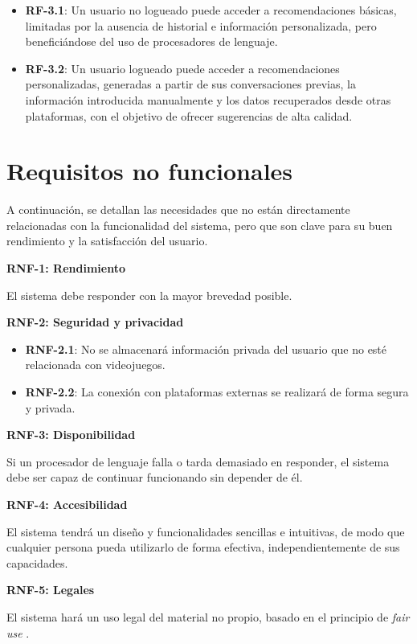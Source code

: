 \begin{itemize}
    \item \textbf{RF-3.1}: Un usuario no logueado puede acceder a recomendaciones básicas, limitadas por la ausencia de historial e información personalizada, pero beneficiándose del uso de procesadores de lenguaje.
    \item \textbf{RF-3.2}: Un usuario logueado puede acceder a recomendaciones personalizadas, generadas a partir de sus conversaciones previas, la información introducida manualmente y los datos recuperados desde otras plataformas, con el objetivo de ofrecer sugerencias de alta calidad.
\end{itemize}

\newpage
\section{Requisitos no funcionales}

A continuación, se detallan las necesidades que no están directamente relacionadas con la funcionalidad del sistema, pero que son clave para su buen rendimiento y la satisfacción del usuario.

\textbf{RNF-1: Rendimiento}

El sistema debe responder con la mayor brevedad posible.

\textbf{RNF-2: Seguridad y privacidad}

\begin{itemize}
    \item \textbf{RNF-2.1}: No se almacenará información privada del usuario que no esté relacionada con videojuegos.
    \item \textbf{RNF-2.2}: La conexión con plataformas externas se realizará de forma segura y privada.
\end{itemize}

\textbf{RNF-3: Disponibilidad}

Si un procesador de lenguaje falla o tarda demasiado en responder, el sistema debe ser capaz de continuar funcionando sin depender de él.

\textbf{RNF-4: Accesibilidad}

El sistema tendrá un diseño y funcionalidades sencillas e intuitivas, de modo que cualquier persona pueda utilizarlo de forma efectiva, independientemente de sus capacidades.

\textbf{RNF-5: Legales}

El sistema hará un uso legal del material no propio, basado en el principio de \textit{fair use} \cite{fair-use}.

